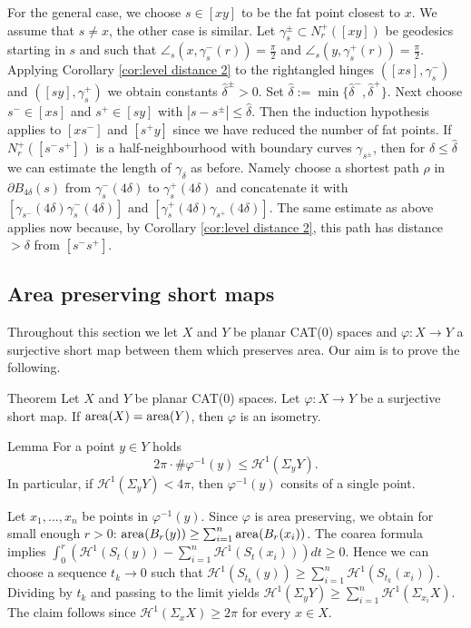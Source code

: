 \documentclass[a4paper,10pt]{amsart}
\begin{document}
For the general case, we choose $s\in[xy]$ to be the fat point closest to $x$. We assume that $s\neq x$,
the other case is similar. Let $\gamma_s^\pm\subset N_r^+([x y])$ be geodesics starting in $s$ and such that 
$\angle_s(x,\gamma_s^-(r))=\frac{\pi}{2}$ and $\angle_s(y,\gamma_s^+(r))=\frac{\pi}{2}$. Applying Corollary 
\ref{cor:level distance 2}
to the rightangled hinges $([xs],\gamma_s^-)$ and $([sy],\gamma_s^+)$ we obtain constants $\hat\delta^\pm>0$. 
Set $\hat\delta:=\min\{\hat\delta^-,\hat\delta^+\}$.
Next choose $s^-\in[xs]$ and $s^+\in[sy]$ with $|s-s^\pm|\leq\hat\delta$. Then the induction hypothesis applies 
to $[xs^-]$ and $[s^+y]$ since we have reduced 
the number of fat points. If $N^+_r([s^- s^+])$ is a half-neighbourhood with boundary curves $\gamma_{s^\pm}$, 
then for $\delta\leq\hat\delta$ we can estimate the length of $\gamma_\delta$ as before. 
Namely choose a shortest path $\rho$ in $\partial B_{4\delta}(s)$ from $\gamma_s^-(4\delta)$ to $\gamma_s^+(4\delta)$ 
and concatenate it 
with $[\gamma_{s^-}(4\delta)\gamma_s^-(4\delta)]$ and $[\gamma_s^+(4\delta)\gamma_{s^+}(4\delta)]$. The same estimate 
as above applies now because, by Corollary \ref{cor:level distance 2}, this path has distance $>\delta$ from $[s^- s^+]$.
\qeds



\subsection{Area preserving short maps}


Throughout this section we let $X$ and $Y$ be planar CAT(0) spaces and
 $\varphi:X\to Y$ a surjective short map between them which preserves area.
 Our aim is to prove the following.

\begin{thm}{Theorem}\label{thm:short+area=isom}
Let $X$ and $Y$ be planar CAT(0) spaces. 
Let $\varphi:X\to Y$ be a surjective short map. If $\mathop{\rm area}\nolimits(X)=\mathop{\rm area}\nolimits(Y)$,
then $\varphi$ is an isometry. 
\end{thm}


\begin{thm}{Lemma}\label{lem:inverse image estimate}
For a point $y\in Y$ holds 
$$
2\pi\cdot \#\varphi^{-1}(y)\leq\mathcal{H}^1(\Sigma_y Y). 
$$
In particular, if $\mathcal{H}^1(\Sigma_y Y)<4\pi$, then $\varphi^{-1}(y)$
consits of a single point.
\end{thm}

Let $x_1,\ldots,x_n$ be points in $\varphi^{-1}(y)$. Since $\varphi$
is area preserving, we obtain for small enough $r>0$:
$\mathop{\rm area}\nolimits(B_r(y))\geq\sum_{i=1}^n\mathop{\rm area}\nolimits(B_r(x_i))$. The coarea formula implies
$\int_0^r(\mathcal{H}^1(S_t(y))-\sum_{i=1}^n \mathcal{H}^1(S_t(x_i)))dt\geq 0$.
Hence we can choose a sequence $t_k\to 0$ such that 
$\mathcal{H}^1(S_{t_k}(y))\geq\sum_{i=1}^n \mathcal{H}^1(S_{t_k}(x_i))$. 
Dividing by $t_k$ and passing to the limit yields 
$\mathcal{H}^1(\Sigma_y Y)\geq\sum_{i=1}^n\mathcal{H}^1(\Sigma_{x_i}X)$.
The claim follows since $\mathcal{H}^1(\Sigma_{x}X)\geq 2\pi$
for every $x\in X$.
\qeds
\end{document}
